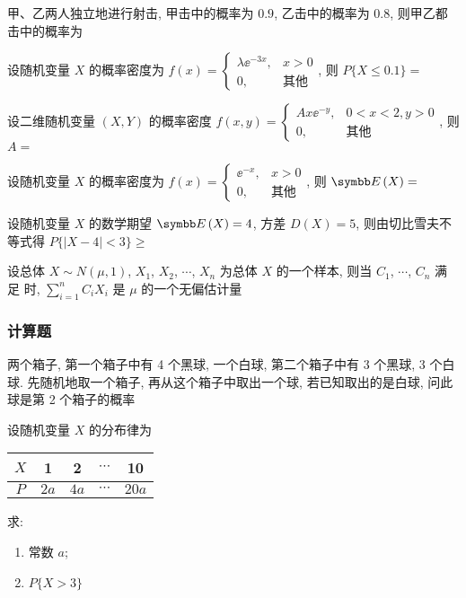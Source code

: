 \begin{ti}
	甲、乙两人独立地进行射击, 甲击中的概率为 $0.9$, 乙击中的概率为 $0.8$, 则甲乙都击中的概率为 \hua
\end{ti}

\begin{ti}
	设随机变量 $X$ 的概率密度为 $f(x) = \begin{cases}
		\lambda \ee^{-3x}, & x > 0 \\
		0, & \text{其他}
	\end{cases}$, 则 $P\{ X \leqslant 0.1 \} =$ \hua
\end{ti}

\begin{ti}
	设二维随机变量 $(X,Y)$ 的概率密度 $f(x,y) = \begin{cases}
		Ax \ee^{-y}, & 0 < x < 2, y > 0 \\
		0, & \text{其他}
	\end{cases}$, 则 $A =$ \hua
\end{ti}

\begin{ti}
	设随机变量 $X$ 的概率密度为 $f(x) = \begin{cases}
		\ee^{-x}, & x > 0 \\
		0, & \text{其他}
	\end{cases}$, 则 $\EE(X) =$ \hua
\end{ti}

\begin{ti}
	设随机变量 $X$ 的数学期望 $\EE(X) = 4$, 方差 $D(X) = 5$, 则由切比雪夫不等式得 $P\{ |X - 4| < 3 \} \geqslant$ \hua
\end{ti}

\begin{ti}
	设总体 $X \sim N(\mu,1)$, $X_1$, $X_2$, $\cdots$, $X_n$ 为总体 $X$ 的一个样本, 则当 $C_1$, $\cdots$, $C_n$ 满足 \hua{} 时, $\sum_{i=1}^n C_i X_i$ 是 $\mu$ 的一个无偏估计量
\end{ti}

\subsubsection{计算题}
\begin{ti}
	两个箱子, 第一个箱子中有 4 个黑球, 一个白球, 第二个箱子中有 3 个黑球, 3 个白球. 先随机地取一个箱子, 再从这个箱子中取出一个球, 若已知取出的是白球, 问此球是第 2 个箱子的概率
\end{ti}

\begin{ti}
	设随机变量 $X$ 的分布律为
	\begin{center}
		\begin{tabular}{c|*{4}{c}}
			$X$ & 1 & 2 & $\cdots$ & 10 \\
			\hline
			$P$ & $2a$ & $4a$ & $\cdots$ & $20a$
		\end{tabular}
	\end{center}
	求:
	\begin{enumerate}
		\item 常数 $a$;
		\item $P\{ X>3 \}$
	\end{enumerate}
\end{ti}

